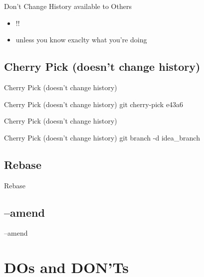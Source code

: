\documentclass{beamer}
\begin{document}
\begin{frame}{Don't Change History available to Others}
  \begin{itemize}
    \item
      !!
    \item
      unless you know exaclty what you're doing
  \end{itemize}
\end{frame}

\subsection{Cherry Pick (doesn't change history)}

\begin{frame}{Cherry Pick (doesn't change history)}
    \centering
    \hfill\vfill
\end{frame}

\begin{frame}{Cherry Pick (doesn't change history)}
  git cherry-pick e43a6
\end{frame}

\begin{frame}{Cherry Pick (doesn't change history)}
    \centering
    \hfill\vfill
\end{frame}

\begin{frame}{Cherry Pick (doesn't change history)}
  git branch -d idea_branch
\end{frame}

\subsection{Rebase}

\begin{frame}{Rebase}
\end{frame}

\subsection{--amend}

\begin{frame}{--amend}
\end{frame}

\section{DOs and DON'Ts}
\end{document}
